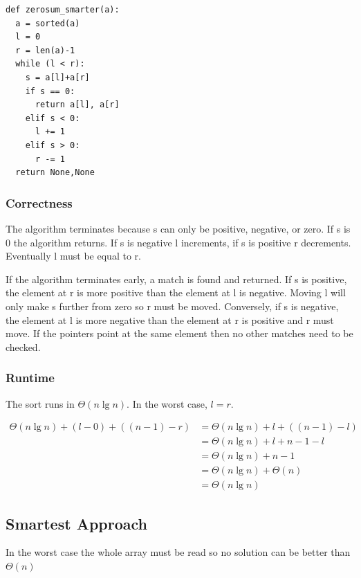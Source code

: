 \documentclass[11pt]{article}
\begin{document}
\lstset{language=Python,label= ,caption= ,numbers=none}
\begin{lstlisting}
def zerosum_smarter(a):
  a = sorted(a)
  l = 0
  r = len(a)-1
  while (l < r):
    s = a[l]+a[r]
    if s == 0:
      return a[l], a[r]
    elif s < 0:
      l += 1
    elif s > 0:
      r -= 1
  return None,None
\end{lstlisting}

\subsubsection{Correctness}
\label{sec-1-2-1}

The algorithm terminates because s can only be positive, negative, or
zero. If s is 0 the algorithm returns. If s is negative l increments,
if s is positive r decrements. Eventually l must be equal to r.

If the algorithm terminates early, a match is found and returned. If s
is positive, the element at r is more positive than the element at l
is negative. Moving l will only make s further from zero so r must be
moved. Conversely, if s is negative, the element at l is more negative
than the element at r is positive and r must move. If the pointers
point at the same element then no other matches need to be checked.

\subsubsection{Runtime}
\label{sec-1-2-2}

The sort runs in $\Theta (n \lg n)$. In the worst case, $l = r$.

\begin{align}
\Theta (n \lg n) + (l - 0) + ((n-1) - r) &= \Theta (n \lg n) + l + ((n-1) - l) \\
&= \Theta (n \lg n) + l + n - 1 - l \\
&= \Theta (n \lg n) + n - 1 \\
&= \Theta (n \lg n) + \Theta (n) \\
&= \Theta (n \lg n)
\end{align}

\subsection{Smartest Approach}
\label{sec-1-3}

In the worst case the whole array must be read so no solution can be
better than $\Theta (n)$
\end{document}
